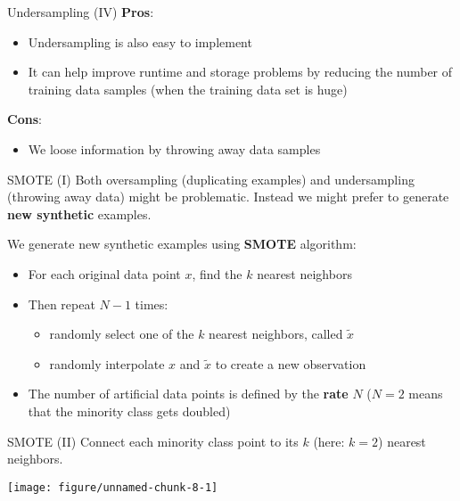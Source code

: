 \documentclass[11pt,compress,t,notes=noshow, aspectratio=169, xcolor=table]{beamer}
\begin{document}
\begin{frame}{Undersampling (IV)}
\label{undersampling-iv}
\textbf{Pros}:

\begin{itemize}
\tightlist
\item
  Undersampling is also easy to implement
\item
  It can help improve runtime and storage problems by reducing the
  number of training data samples (when the training data set is huge)
\end{itemize}

\textbf{Cons}:

\begin{itemize}
\tightlist
\item
  We loose information by throwing away data samples
\end{itemize}
\end{frame}

\begin{frame}{SMOTE (I)}
\label{smote-i}
Both oversampling (duplicating examples) and undersampling (throwing
away data) might be problematic. Instead we might prefer to generate
\textbf{new synthetic} examples.

We generate new synthetic examples using \textbf{SMOTE} algorithm:

\begin{itemize}
\tightlist
\item
  For each original data point \(x\), find the \(k\) nearest neighbors
\item
  Then repeat \(N - 1\) times:

  \begin{itemize}
  \tightlist
  \item
    randomly select one of the \(k\) nearest neighbors, called
    \(\tilde x\)
  \item
    randomly interpolate \(x\) and \(\tilde x\) to create a new
    observation
  \end{itemize}
\item
  The number of artificial data points is defined by the \textbf{rate}
  \(N\) (\(N = 2\) means that the minority class gets doubled)
\end{itemize}
\end{frame}

\begin{frame}{SMOTE (II)}
\label{smote-ii}
Connect each minority class point to its \(k\) (here: \(k = 2\)) nearest
neighbors.

\scriptsize

\begin{center}\texttt{[image: figure/unnamed-chunk-8-1]} \end{center}

\normalsize
\end{frame}
\end{document}
